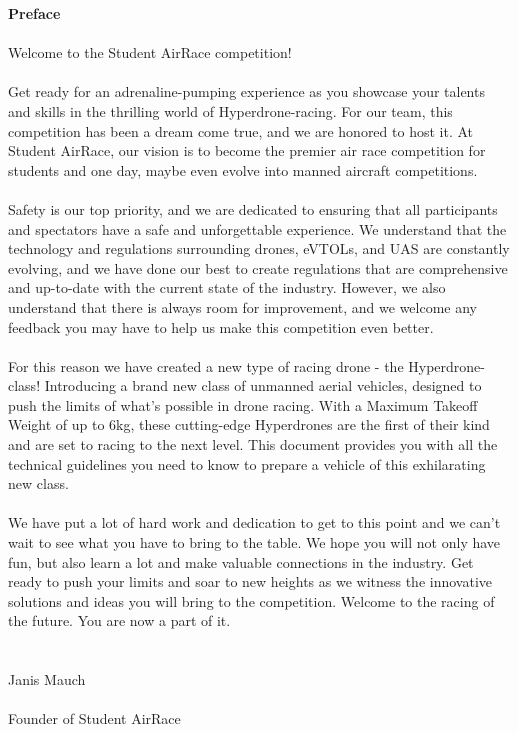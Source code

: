 \newpage
{\bf Preface}
\\ \\ Welcome to the Student AirRace competition! \\ \\
Get ready for an adrenaline-pumping experience as you showcase your talents and skills in the thrilling world of Hyperdrone-racing. 
For our team, this competition has been a dream come true, and we are honored to host it. 
At Student AirRace, our vision is to become the premier air race competition for students and one day, maybe even evolve into manned aircraft competitions.
\\ \\ 
Safety is our top priority, and we are dedicated to ensuring that all participants and spectators have a safe and unforgettable experience. 
We understand that the technology and regulations surrounding drones, eVTOLs, and UAS are constantly evolving, and we have done our best to create regulations that are comprehensive and up-to-date with the current state of the industry. 
However, we also understand that there is always room for improvement, and we welcome any feedback you may have to help us make this competition even better.
\\ \\ 
For this reason we have created a new type of racing drone - the Hyperdrone-class! Introducing a brand new class of unmanned aerial vehicles, designed to push the limits of what's possible in drone racing. With a Maximum Takeoff Weight of up to 6kg, these cutting-edge Hyperdrones are the first of their kind and are set to racing to the next level. This document provides you with all the technical guidelines you need to know to prepare a vehicle of this exhilarating new class. 
\\ \\
We have put a lot of hard work and dedication to get to this point and we can't wait to see what you have to bring to the table. 
We hope you will not only have fun, but also learn a lot and make valuable connections in the industry. 
Get ready to push your limits and soar to new heights as we witness the innovative solutions and ideas you will bring to the competition. 
Welcome to the racing of the future. You are now a part of it.
\\ \\ \\
Janis Mauch 
\\ \\Founder of Student AirRace

